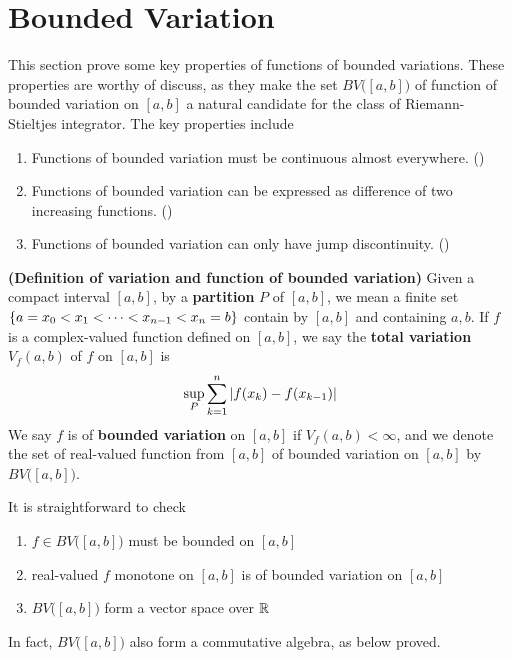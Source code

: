 \documentclass{report}
\begin{document}
\section{Bounded Variation}
\begin{mdframed}
This section prove some key properties of functions of bounded variations. These properties are worthy of discuss, as they make the set $BV\big([a,b] \big)$ of function of bounded variation on $[a,b]$ a natural candidate for the class of Riemann-Stieltjes integrator. The key properties include 
\begin{enumerate}[label=(\alph*)]
  \item Functions of bounded variation must be continuous almost everywhere. ()
  \item Functions of bounded variation can be expressed as difference of two increasing functions. () 
  \item Functions of bounded variation can only have jump discontinuity. ()
\end{enumerate}
\end{mdframed}
\begin{definition}
\textbf{(Definition of variation and function of bounded variation)} Given a compact interval $[a,b]$, by a \textbf{partition} $P$ of $[a,b]$, we mean a finite set $\{ a=x_0<x_1 < \cdots < x_{n-1} < x_n =b \}$ contain by $[a,b]$ and containing $a,b$. If  $f$ is a complex-valued function defined on $[a,b]$, we say the \textbf{total variation} $V_f(a,b)$ of $f$ on  $[a,b]$ is 
\begin{align*}
\sup_P \sum_{k=1}^n \left|f(x_k)-f(x_{k-1})\right|
\end{align*}
We say $f$ is of \textbf{bounded variation} on $[a,b]$ if $V_f(a,b)<\infty$, and we denote the set of real-valued function from $[a,b]$ of bounded variation on $[a,b]$ by $BV\big([a,b] \big)$. 
\end{definition}
\begin{mdframed}
It is straightforward to check 
\begin{enumerate}[label=(\alph*)]
  \item  $f \in BV\big([a,b] \big)$ must be bounded on $[a,b]$ 
  \item real-valued $f$ monotone on $[a,b]$ is of bounded variation on $[a,b]$ 
  \item $BV\big([a,b] \big)$ form a vector space over $\mathbb{R}$
\end{enumerate}
In fact, $BV\big([a,b] \big)$ also form a commutative algebra, as below proved.
\end{mdframed}
\end{document}
